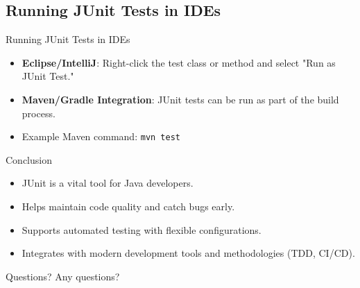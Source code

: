\documentclass{beamer}
\begin{document}
\subsection{Running JUnit Tests in IDEs}

\begin{frame}{Running JUnit Tests in IDEs}
	\begin{itemize}
		\item \textbf{Eclipse/IntelliJ}: Right-click the test class or method and select "Run as JUnit Test."
		\item \textbf{Maven/Gradle Integration}: JUnit tests can be run as part of the build process.
		\item Example Maven command: \texttt{mvn test}
	\end{itemize}
\end{frame}

\begin{frame}{Conclusion}
	\begin{itemize}
		\item JUnit is a vital tool for Java developers.
		\item Helps maintain code quality and catch bugs early.
		\item Supports automated testing with flexible configurations.
		\item Integrates with modern development tools and methodologies (TDD, CI/CD).
	\end{itemize}
\end{frame}

\begin{frame}{Questions?}
	\centering
	Any questions?
\end{frame}
\end{document}
